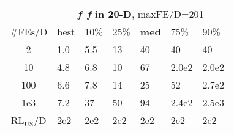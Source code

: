 \begin{tabular}{c|llllll}
 & \multicolumn{6}{|c}{\textbf{\textit{f}\raisebox{-0.35ex}{1}--\textit{f}\raisebox{-0.35ex}{24} in 20-D}, maxFE/D=201}\\
\#FEs/D & best & 10\% & 25\% & \textbf{med} & 75\% & 90\%\\
2 & \hspace*{1ex}1.0 & \hspace*{1ex}5.5 & 13 & 40 & 40 & 40\\
10 & \hspace*{1ex}4.8 & \hspace*{1ex}6.8 & 10 & 67 & 2.0e2 & 2.0e2\\
100 & \hspace*{1ex}6.6 & \hspace*{1ex}7.8 & 14 & 25 & 52 & 2.7e2\\
1e3 & \hspace*{1ex}7.2 & 37 & 50 & 94 & 2.4e2 & 2.5e3\\
$\text{RL}_{\text{US}}$/D & 2e2 & 2e2 & 2e2 & 2e2 & 2e2 & 2e2
\end{tabular}
